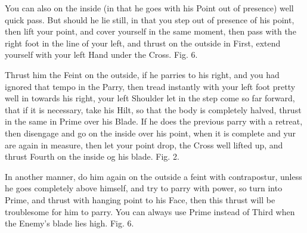 \newpage


\newpage


You can also on the inside (in that he goes with his Point out of
presence) well quick pass. But should he lie still, in that you step
out of presence of his point, then lift your point, and cover yourself
in the same moment, then pass with the right foot in the line of your
left, and thrust on the outside in First, extend yourself with your
left Hand under the Cross. Fig. 6.


\exercise{}
Thrust him the Feint on the outside, if he parries to his right, and
you had ignored that tempo in the Parry, then tread instantly with
your left foot pretty well in towards his right, your left Shoulder
let in the step come so far forward, that if it is necessary, take his
Hilt, so that the body is completely halved, thrust in the same in
Prime over his Blade. If he does the previous parry with a retreat,
then disengage and go on the inside over his point, when it is
complete and yur are again in measure, then let your point drop, the
Cross well lifted up, and thrust Fourth on the inside og his
blade. Fig. 2.


\exercise{}
In another manner, do him again on the outside a feint with
contrapostur, unless he goes completely above himself, and try to
parry with power, so turn into Prime, and thrust with hanging point to
his Face, then this thrust will be troublesome for him to
parry. You can always use Prime instead of Third when the Enemy's
blade lies high. Fig. 6.


